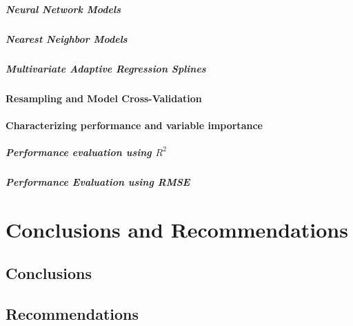 \documentclass[letterpaper,12pt,titlepage,oneside,final]{report}
\begin{document}
                \paragraph {Neural Network Models}
                \paragraph {Nearest Neighbor Models}
                \paragraph {Multivariate Adaptive Regression Splines}

            \subsubsection {Resampling and Model Cross-Validation}

            \subsubsection{Characterizing performance and variable importance}

                \paragraph {Performance evaluation using $R^2$}
                \paragraph {Performance Evaluation using RMSE}

\chapter{Conclusions and Recommendations}
    \section{Conclusions}
    \section{Recommendations}

\end{document}
